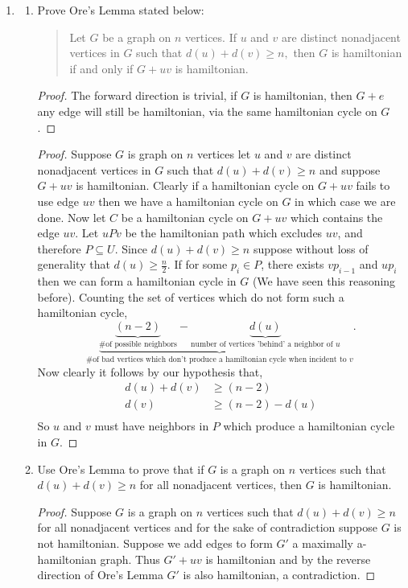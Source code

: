 \documentclass[12pt]{article}
\begin{document}
\begin{enumerate}
	
	\item 
	\begin{enumerate}
	\item Prove Ore's Lemma stated below:
	\begin{quote} Let $G$ be a graph on $n$ vertices. If $u$ and $v$ are distinct nonadjacent vertices in $G$ such that $d(u)+d(v)\geq n,$ then $G$ is hamiltonian if and only if $G+uv$ is hamiltonian.\end{quote}
	\begin{proof} The forward direction is trivial, if $G$ is hamiltonian, then $G + e$ any edge will still be hamiltonian, via the same hamiltonian cycle on $G$.  
	\end{proof}
	\begin{proof} Suppose $G$ is graph on $n$ vertices let $u$ and $v$ are distinct nonadjacent vertices in $G$ such that $d(u)+d(v)\geq n$ and suppose $G + uv$ is hamiltonian. Clearly if a hamiltonian cycle on $G + uv$ fails to use edge $uv$ then we have a hamiltonian cycle on $G$ in which case we are done. Now let $C$ be a hamiltonian cycle on $G + uv$ which contains the edge $uv$. Let $uPv$ be the hamiltonian path which excludes $uv$, and therefore $P \subseteq U$.  Since $d(u) + d(v) \geq n$ suppose without loss of generality that $d(u) \geq \frac{n}{2}$. If for some $p_i \in P$, there exists $vp_{i - 1}$ and $up_{i}$ then we can form a hamiltonian cycle in $G$ (We have seen this reasoning before). Counting the set of vertices which do not form such a hamiltonian cycle, 
		\begin{equation*}
			\underbrace{\underbrace{(n - 2)}_{\text{\# of possible neighbors}} - \underbrace{d(u)}_{\text{number of vertices 'behind' a neighbor of $u$}}}_{\text{\# of bad vertices which don't produce a hamiltonian cycle when incident to $v$}}. 
		\end{equation*}
		Now clearly it follows by our hypothesis that, 
		\begin{align*}
			d(u) + d(v) &\geq (n - 2)\\
			d(v) &\geq (n - 2) - d(u)\\
		\end{align*}
		So $u$ and $v$ must have neighbors in $P$ which produce a hamiltonian cycle in $G$.
	\end{proof}








	\item Use Ore's Lemma to prove that if $G$ is a graph on $n$ vertices such that $d(u)+d(v) \geq n$ for all nonadjacent vertices, then $G$ is hamiltonian.
	\begin{proof} Suppose $G$ is a graph on $n$ vertices such that $d(u)+d(v) \geq n$ for all nonadjacent vertices and for the sake of contradiction suppose $G$ is not hamiltonian. Suppose we add edges to form $G'$ a maximally a-hamiltonian graph. Thus $G' + uv$ is hamiltonian and by the reverse direction of Ore's Lemma $G'$ is also hamiltonian, a contradiction. 
	\end{proof}







\end{enumerate}
\end{enumerate}
\end{document}
